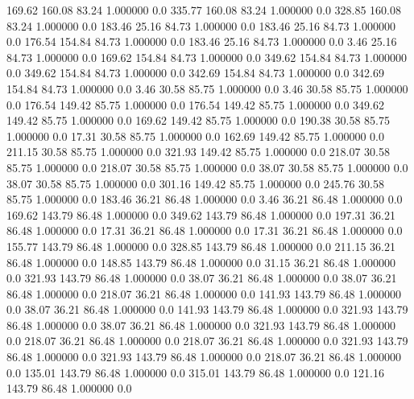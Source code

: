   169.62  160.08   83.24    1.000000    0.0
  335.77  160.08   83.24    1.000000    0.0
  328.85  160.08   83.24    1.000000    0.0
  183.46   25.16   84.73    1.000000    0.0
  183.46   25.16   84.73    1.000000    0.0
  176.54  154.84   84.73    1.000000    0.0
  183.46   25.16   84.73    1.000000    0.0
    3.46   25.16   84.73    1.000000    0.0
  169.62  154.84   84.73    1.000000    0.0
  349.62  154.84   84.73    1.000000    0.0
  349.62  154.84   84.73    1.000000    0.0
  342.69  154.84   84.73    1.000000    0.0
  342.69  154.84   84.73    1.000000    0.0
    3.46   30.58   85.75    1.000000    0.0
    3.46   30.58   85.75    1.000000    0.0
  176.54  149.42   85.75    1.000000    0.0
  176.54  149.42   85.75    1.000000    0.0
  349.62  149.42   85.75    1.000000    0.0
  169.62  149.42   85.75    1.000000    0.0
  190.38   30.58   85.75    1.000000    0.0
   17.31   30.58   85.75    1.000000    0.0
  162.69  149.42   85.75    1.000000    0.0
  211.15   30.58   85.75    1.000000    0.0
  321.93  149.42   85.75    1.000000    0.0
  218.07   30.58   85.75    1.000000    0.0
  218.07   30.58   85.75    1.000000    0.0
   38.07   30.58   85.75    1.000000    0.0
   38.07   30.58   85.75    1.000000    0.0
  301.16  149.42   85.75    1.000000    0.0
  245.76   30.58   85.75    1.000000    0.0
  183.46   36.21   86.48    1.000000    0.0
    3.46   36.21   86.48    1.000000    0.0
  169.62  143.79   86.48    1.000000    0.0
  349.62  143.79   86.48    1.000000    0.0
  197.31   36.21   86.48    1.000000    0.0
   17.31   36.21   86.48    1.000000    0.0
   17.31   36.21   86.48    1.000000    0.0
  155.77  143.79   86.48    1.000000    0.0
  328.85  143.79   86.48    1.000000    0.0
  211.15   36.21   86.48    1.000000    0.0
  148.85  143.79   86.48    1.000000    0.0
   31.15   36.21   86.48    1.000000    0.0
  321.93  143.79   86.48    1.000000    0.0
   38.07   36.21   86.48    1.000000    0.0
   38.07   36.21   86.48    1.000000    0.0
  218.07   36.21   86.48    1.000000    0.0
  141.93  143.79   86.48    1.000000    0.0
   38.07   36.21   86.48    1.000000    0.0
  141.93  143.79   86.48    1.000000    0.0
  321.93  143.79   86.48    1.000000    0.0
   38.07   36.21   86.48    1.000000    0.0
  321.93  143.79   86.48    1.000000    0.0
  218.07   36.21   86.48    1.000000    0.0
  218.07   36.21   86.48    1.000000    0.0
  321.93  143.79   86.48    1.000000    0.0
  321.93  143.79   86.48    1.000000    0.0
  218.07   36.21   86.48    1.000000    0.0
  135.01  143.79   86.48    1.000000    0.0
  315.01  143.79   86.48    1.000000    0.0
  121.16  143.79   86.48    1.000000    0.0
